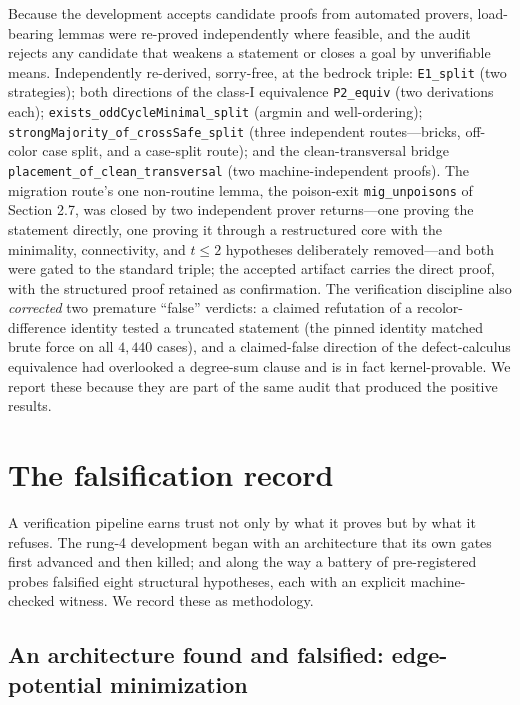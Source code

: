 \documentclass[11pt]{article}
\theoremstyle{definition}
\theoremstyle{remark}
\begin{document}
Because the development accepts candidate proofs from automated provers, load-bearing lemmas were re-proved independently where feasible, and the audit rejects any candidate that weakens a statement or closes a goal by unverifiable means. Independently re-derived, sorry-free, at the bedrock triple: \texttt{E1\_split} (two strategies); both directions of the class-I equivalence \texttt{P2\_equiv} (two derivations each); \texttt{exists\_oddCycleMinimal\_split} (argmin and well-ordering); \texttt{strongMajority\_of\_crossSafe\_split} (three independent routes---bricks, off-color case split, and a case-split route); and the clean-transversal bridge \texttt{placement\_of\_clean\_transversal} (two machine-independent proofs). The migration route's one non-routine lemma, the poison-exit \texttt{mig\_unpoisons} of Section 2.7, was closed by two independent prover returns---one proving the statement directly, one proving it through a restructured core with the minimality, connectivity, and $t \le 2$ hypotheses deliberately removed---and both were gated to the standard triple; the accepted artifact carries the direct proof, with the structured proof retained as confirmation. The verification discipline also \emph{corrected} two premature ``false'' verdicts: a claimed refutation of a recolor-difference identity tested a truncated statement (the pinned identity matched brute force on all $4{,}440$ cases), and a claimed-false direction of the defect-calculus equivalence had overlooked a degree-sum clause and is in fact kernel-provable. We report these because they are part of the same audit that produced the positive results.

\section{The falsification record}\label{4-the-falsification-record}

A verification pipeline earns trust not only by what it proves but by what it refuses. The rung-4 development began with an architecture that its own gates first advanced and then killed; and along the way a battery of pre-registered probes falsified eight structural hypotheses, each with an explicit machine-checked witness. We record these as methodology.

\subsection{An architecture found and falsified: edge-potential minimization}\label{41-epot}
\end{document}
